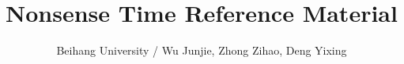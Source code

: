 \documentclass[a4paper]{article}
\begin{document}
\title{\Huge \bf Nonsense Time Reference Material}
\author{Beihang University / Wu Junjie, Zhong Zihao, Deng Yixing}

\maketitle

\begin{multicols*}{2}
\tableofcontents
\end{multicols*}

\clearpage

\columnseprule=0pt
\fontsize{7pt}{9pt}
\selectfont

\setcounter{page}{1}
\begin{multicols*}{2}

\end{multicols*}
\end{document}
